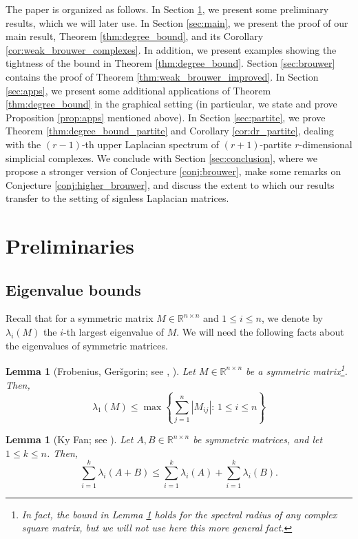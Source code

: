 \documentclass[a4paper,11pt]{article}
\theoremstyle{plain}
\newtheorem{lemma}[theorem]{\bf Lemma}
\theoremstyle{definition}
\numberwithin{theorem}{section}
\numberwithin{equation}{section}
\newcommand{\Rea}{{\mathbb R}}
\begin{document}
The paper is organized as follows. In Section \ref{sec:prelims}, we present some preliminary results, which we will later use. In Section \ref{sec:main}, we present the proof of our main result, Theorem \ref{thm:degree_bound}, and its Corollary \ref{cor:weak_brouwer_complexes}. In addition, we present examples showing the tightness of the bound in Theorem \ref{thm:degree_bound}. Section \ref{sec:brouwer} contains the proof of Theorem \ref{thm:weak_brouwer_improved}. In Section \ref{sec:apps}, we present some additional applications of Theorem \ref{thm:degree_bound} in the graphical setting (in particular, we state and prove Proposition \ref{prop:apps} mentioned above). 
In Section \ref{sec:partite}, we prove Theorem \ref{thm:degree_bound_partite} and Corollary \ref{cor:dr_partite}, dealing with the $(r-1)$-th upper Laplacian spectrum of $(r+1)$-partite $r$-dimensional simplicial complexes. 
We conclude with Section \ref{sec:conclusion}, where we propose a stronger version of Conjecture \ref{conj:brouwer}, make some remarks on Conjecture \ref{conj:higher_brouwer}, and discuss the extent to which our results transfer to the setting of signless Laplacian matrices. 


\section{Preliminaries}\label{sec:prelims}


\subsection{Eigenvalue bounds}

Recall that for a symmetric matrix $M\in\Rea^{n\times n}$ and $1\le i\le n$, we denote by $\lambda_i(M)$ the $i$-th largest eigenvalue of $M$.
We will need the following facts about the eigenvalues of symmetric matrices.

\begin{lemma}[Frobenius, Ger\v{s}gorin; see {\cite[I.1]{marshall2011inequalities}}, {\cite[Theorem 6.1.1]{horn2013matrix}}]
\label{lemma:frobenius}
    Let $M\in\Rea^{n\times n}$ be a symmetric matrix\footnote{In fact, the bound in Lemma \ref{lemma:frobenius} holds for the spectral radius of any complex square matrix, but we will not use here this more general fact.}. Then,
    \[
        \lambda_1(M)\le \max \left\{ \sum_{j=1}^n |M_{ij}| :\, 1\le i\le n\right\}
    \]
\end{lemma}

\begin{lemma}[Ky Fan; see {\cite[Proposition A.6]{marshall2011inequalities}}]\label{lemma:ky_fan}
    Let $A,B\in\Rea^{n\times n}$ be symmetric matrices, and let $1\le k\le n$. Then,
    \[
        \sum_{i=1}^k\lambda_i(A+B)\le \sum_{i=1}^k\lambda_i(A)+\sum_{i=1}^k \lambda_i(B).
    \]
\end{lemma}
\end{document}

